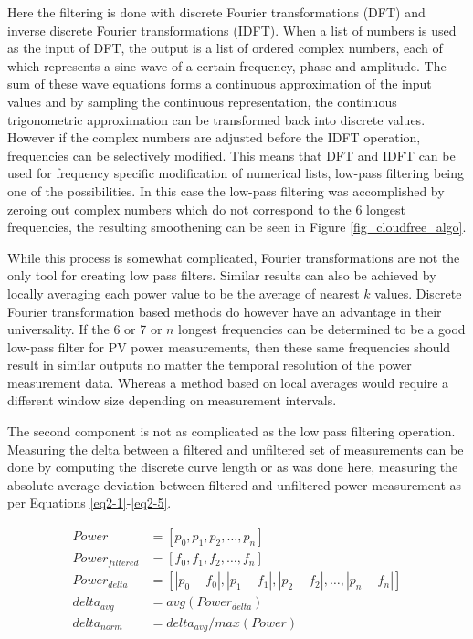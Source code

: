 Here the filtering is done with discrete Fourier transformations (DFT) and inverse discrete Fourier transformations (IDFT). When a list of numbers is used as the input of DFT, the output is a list of ordered complex numbers, each of which represents a sine wave of a certain frequency, phase and amplitude. The sum of these wave equations forms a continuous approximation of the input values and by sampling the continuous representation, the continuous trigonometric approximation can be transformed back into discrete values. However if the complex numbers are adjusted before the IDFT operation, frequencies can be selectively modified. This means that DFT and IDFT can be used for frequency specific modification of numerical lists, low-pass filtering being one of the possibilities. In this case the low-pass filtering was accomplished by zeroing out complex numbers which do not correspond to the 6 longest frequencies, the resulting smoothening can be seen in Figure \ref{fig_cloudfree_algo}.


While this process is somewhat complicated, Fourier transformations are not the only tool for creating low pass filters. Similar results can also be achieved by locally averaging each power value to be the average of nearest $k$ values. Discrete Fourier transformation based methods do however have an advantage in their universality. If the 6 or 7 or $n$ longest frequencies can be determined to be a good low-pass filter for PV power measurements, then these same frequencies should result in similar outputs no matter the temporal resolution of the power measurement data. Whereas a method based on local averages would require a different window size depending on measurement intervals.

The second component is not as complicated as the low pass filtering operation. Measuring the delta between a filtered and unfiltered set of measurements can be done by computing the discrete curve length or as was done here, measuring the absolute average deviation between filtered and unfiltered power measurement as per Equations \ref{eq2-1}-\ref{eq2-5}.


\begin{align}
Power &= [p_0, p_1, p_2, \dots , p_n]   \label{eq2-1}\\ 
Power_{filtered} &= [f_0, f_1, f_2, \dots , f_n] \\
Power_{delta} &= [|p_0 - f_0|, |p_1-f_1|, |p_2-f_2|, \dots , |p_n-f_n|] \\
delta_{avg} &= avg(Power_{delta}) \\
delta_{norm} &= delta_{avg}/ max(Power) \label{eq2-5}
\end{align}


